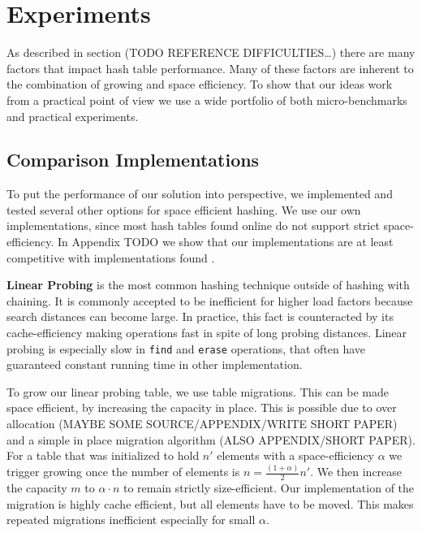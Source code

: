 \documentclass[a4paper,UKenglish]{lipics-v2016}
\begin{document}
\section{Experiments}
As described in section (TODO REFERENCE DIFFICULTIES\ldots{}) there are
many factors that impact hash table performance.  Many of these
factors are inherent to the combination of growing and space
efficiency.  To show that our ideas work from a practical point of
view we use a wide portfolio of both micro-benchmarks and practical
experiments.

\subsection{Comparison Implementations}
To put the performance of our solution into perspective, we
implemented and tested several other options for space efficient
hashing.  We use our own implementations, since most hash tables found
online do not support strict space-efficiency.  In Appendix TODO we
show that our implementations are at least competitive with
implementations found .

\textbf{Linear Probing} is the most common hashing technique outside of
hashing with chaining.  It is commonly accepted to be inefficient for
higher load factors because search distances can become large.  In
practice, this fact is counteracted by its cache-efficiency making
operations fast in spite of long probing distances.  Linear probing is
especially slow in \verb~find~ and \verb~erase~ operations, that often have
guaranteed constant running time in other implementation.

To grow our linear probing table, we use table migrations.  This can
be made space efficient, by increasing the capacity in place.  This is
possible due to over allocation (MAYBE SOME SOURCE/APPENDIX/WRITE
SHORT PAPER) and a simple in place migration algorithm (ALSO
APPENDIX/SHORT PAPER).  For a table that was initialized to hold $n'$
elements with a space-efficiency $\alpha$ we trigger growing once the
number of elements is $n = \frac{(1+\alpha)}{2}n'$. We then increase
the capacity $m$ to $\alpha\cdot n$ to remain strictly size-efficient.
Our implementation of the migration is highly cache efficient, but
all elements have to be moved.  This makes repeated migrations inefficient
especially for small $\alpha$.
\end{document}
